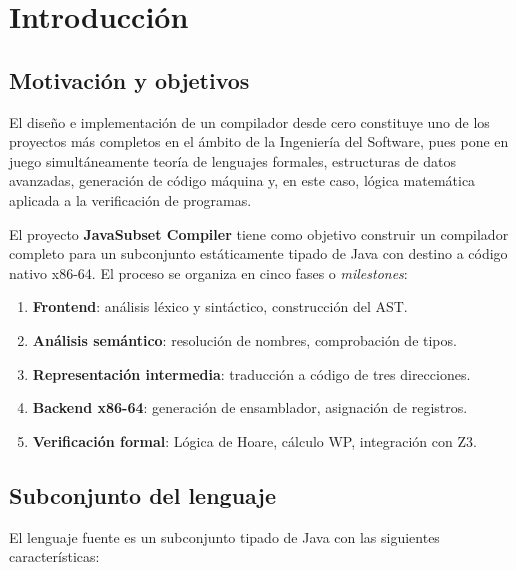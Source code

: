 \chapter{Introducción}
\label{chap:intro}

\section{Motivación y objetivos}

El diseño e implementación de un compilador desde cero constituye uno de los
proyectos más completos en el ámbito de la Ingeniería del Software, pues pone
en juego simultáneamente teoría de lenguajes formales, estructuras de datos
avanzadas, generación de código máquina y, en este caso, lógica matemática
aplicada a la verificación de programas.

El proyecto \textbf{JavaSubset Compiler} tiene como objetivo construir un
compilador completo para un subconjunto estáticamente tipado de Java con destino
a código nativo x86-64. El proceso se organiza en cinco fases o \emph{milestones}:

\begin{enumerate}[label=\textbf{Fase \arabic*.}]
  \item \textbf{Frontend}: análisis léxico y sintáctico, construcción del AST.
  \item \textbf{Análisis semántico}: resolución de nombres, comprobación de tipos.
  \item \textbf{Representación intermedia}: traducción a código de tres direcciones.
  \item \textbf{Backend x86-64}: generación de ensamblador, asignación de registros.
  \item \textbf{Verificación formal}: Lógica de Hoare, cálculo WP, integración con Z3.
\end{enumerate}

\section{Subconjunto del lenguaje}

El lenguaje fuente es un subconjunto tipado de Java con las siguientes
características:

